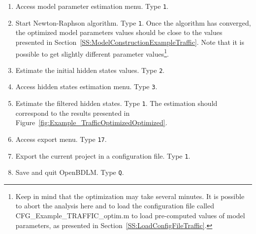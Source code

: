 \begin{enumerate}
\item Access model parameter estimation menu. Type \colorbox{light-gray}{\lstinline[basicstyle = \mlttfamily \small, backgroundcolor = \color{light-gray}]!1!}. 
\item Start Newton-Raphson algorithm. Type \colorbox{light-gray}{\lstinline[basicstyle = \mlttfamily \small, backgroundcolor = \color{light-gray}]!1!}. Once the algorithm has converged, the optimized model parameters values should be close to the values presented in Section~\ref{SS:ModelConstructionExampleTraffic}. Note that it is possible to get slightly different parameter values\footnote{Keep in mind that the optimization may take several minutes. It is possible to abort the analysis here and to load the configuration file called CFG\_Example\_TRAFFIC\_optim.m to load pre-computed values of model parameters, as presented in Section~\ref{SS:LoadConfigFileTraffic}.}.
\item Estimate the initial hidden states values. Type \colorbox{light-gray}{\lstinline[basicstyle = \mlttfamily \small, backgroundcolor = \color{light-gray}]!2!}.
\item Access hidden states estimation menu. Type \colorbox{light-gray}{\lstinline[basicstyle = \mlttfamily \small, backgroundcolor = \color{light-gray}]!3!}. 
\item Estimate the filtered hidden states. Type \colorbox{light-gray}{\lstinline[basicstyle = \mlttfamily \small, backgroundcolor = \color{light-gray}]!1!}. The estimation should correspond to the results presented in Figure~\ref{fig:Example_TrafficOptimizedOptimized}.
\item Access export menu. Type \colorbox{light-gray}{\lstinline[basicstyle = \mlttfamily \small, backgroundcolor = \color{light-gray}]!17!}. 
\item Export the current project in a configuration file. Type \colorbox{light-gray}{\lstinline[basicstyle = \mlttfamily \small, backgroundcolor = \color{light-gray}]!1!}.
\item Save and quit OpenBDLM. Type \colorbox{light-gray}{\lstinline[basicstyle = \mlttfamily \small, backgroundcolor = \color{light-gray}]!Q!}.
\end{enumerate}

